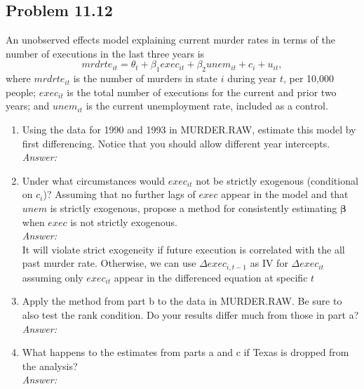 \documentclass[10pt]{article}
\begin{document}
\subsection*{Problem 11.12}
An unobserved effects model explaining current murder rates in terms of the number of executions in the last three years is
\[mrdrte_{it}=\theta_t+\beta_1exec_{it}+\beta_2unem_{it}+c_i+u_{it},\]
where $mrdrte_{it}$ is the number of murders in state $i$ during year $t$, per 10,000 people; $exec_{it}$ is the total number of executions for the current and prior two years; and $unem_{it}$ is the current unemployment rate, included as a control.
\begin{enumerate}[label=\alph*.]
\item Using the data for 1990 and 1993 in MURDER.RAW, estimate this model by first differencing. Notice that you should allow different year intercepts.
\\ \textit{Answer:}\\


\item Under what circumstances would $exec_{it}$ not be strictly exogenous (conditional on $c_i$)? Assuming that no further lags of $exec$ appear in the model and that $unem$ is strictly exogenous, propose a method for consistently estimating $\pmb{\beta}$ when $exec$ is not strictly exogenous.
\\\textit{Answer:}\\
It will violate strict exogeneity if future execution is correlated with the all past murder rate. Otherwise, we can use $\Delta exec_{i,t-1}$ as IV for $\Delta exec_{it}$ assuming only $exec_{it}$ appear in the differenced equation at specific $t$

\item Apply the method from part b to the data in MURDER.RAW. Be sure to also test the rank condition. Do your results differ much from those in part a? 
\\\textit{Answer:}\\


\item What happens to the estimates from parts a and c if Texas is dropped from the analysis?
\\\textit{Answer:}\\

\end{enumerate}
\end{document}
